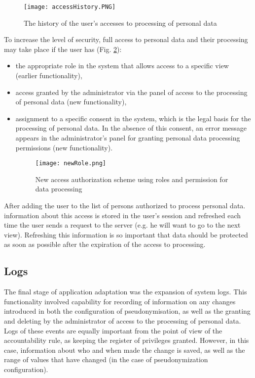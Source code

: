 \documentclass[en, noamssymb]{mgr}
\begin{document}
\begin{figure}[H]
	\centering
	\texttt{[image: accessHistory.PNG]}
	\caption[The history of the user's accesses to processing of personal data]{The history of the user's accesses to processing of personal data}
	\label{fig:usersDataAccessHistory}
\end{figure}

To increase the level of security, full access to personal data and their processing may take place if the user has (Fig. \ref{fig:newRole}):

\begin{itemize}

\item the appropriate role in the system that allows access to a specific view (earlier functionality),
\item access granted by the administrator via the panel of access to the processing of personal data (new functionality),
\item assignment to a specific consent in the system, which is the legal basis for the
processing of personal data. In the absence of this consent, an error message appears in the administrator's panel for granting personal data processing permissions (new functionality).

\begin{figure}[H]
	\centering
	\texttt{[image: newRole.png]}
	\caption[New access authorization scheme using roles and permission for data processing]{New access authorization scheme using roles and permission for data processing}
	\label{fig:newRole}
\end{figure}

\end{itemize}

After adding the user to the list of persons authorized to process personal data. information about this access is stored in the user's session and refreshed each time the user sends a request to the server (e.g. he will want to go to the next view). Refreshing this information is so important that data should be protected as soon as possible after the expiration of the access to processing. 

\subsection{Logs}

The final stage of application adaptation was the expansion of system logs. This functionality involved capability for recording of information on any changes introduced in both the configuration of pseudonymisation, as well as the granting and deleting by the administrator of access to the processing of personal data. Logs of these events are equally important from the point of view of the accountability rule, as keeping the register of privileges granted. However, in this case, information about who and when made the change is saved, as well as the range of values that have changed (in the case of pseudonymization configuration). 
\end{document}
